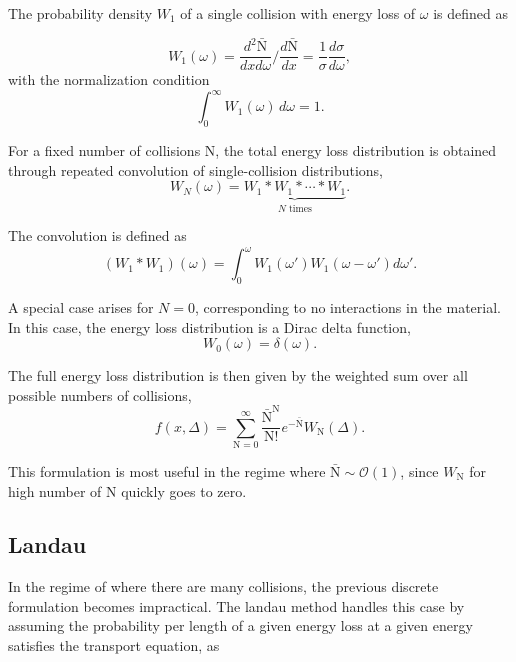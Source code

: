 	
The probability density $W_1$ of a single collision with energy loss of $\omega$ is defined as 

\begin{equation}
W_1 (\omega) = \frac{d^2\bar{\text{N}}}{dxd\omega} / \frac{d\bar{\text{N}}}{dx} = \frac{1}{\sigma} \frac{d \sigma}{d \omega},
\end{equation}
with the normalization condition
\[
\int_0^{\infty} W_1(\omega)\, d\omega = 1.
\]



For a fixed number of collisions N, the total energy loss distribution is obtained through repeated convolution of single-collision distributions,
\begin{equation}
W_N(\omega) = \underbrace{W_1 * W_1 * \cdots * W_1}_{N \text{ times}}.
\end{equation}

The convolution is defined as
\begin{equation}
(W_1 * W_1)(\omega) = \int_0^{\omega} W_1(\omega') W_1(\omega - \omega') d\omega'.
\end{equation}
	
	
A special case arises for $N=0$, corresponding to no interactions in the material. In this case, the energy loss distribution is a Dirac delta function,
\begin{equation}
W_0(\omega) = \delta(\omega).
\end{equation}

The full energy loss distribution is then given by the weighted sum over all possible numbers of collisions,
\begin{equation}
		f(x, \Delta) = \sum_{\text{N}=0}^{\infty}\frac{\bar{\text{N}}^{\text{N}}}{\text{N}!} e^{-\bar{\text{N}}} W_\text{N}(\Delta).
\end{equation}

This formulation is most useful in the regime where $\bar{\text{N}} \sim \mathcal{O}(1)$, since $W_\text{N}$ for high number of N quickly goes to zero.  
	



\subsection{Landau} 


In the regime of where there are many collisions, the previous discrete formulation becomes impractical. The landau method handles this case by assuming the probability per length of a given energy loss at a given energy satisfies the transport equation, as
	
